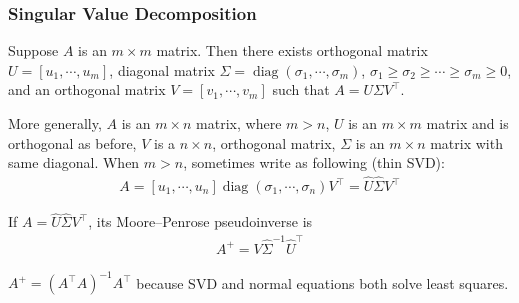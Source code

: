\documentclass[11pt]{article}
\numberwithin{equation}{section}
\begin{document}
\subsubsection{Singular Value Decomposition}
\begin{theorem}
    Suppose $A$ is an $ m \times m$ matrix. Then there exists orthogonal matrix $U=\left[u_1, \cdots, u_m\right]$, diagonal matrix $\Sigma=\operatorname{diag}\left(\sigma_1, \cdots, \sigma_m\right)$, $\sigma_1 \geq \sigma_2 \geq \cdots \geq \sigma_m \geq 0$,
    and an orthogonal matrix $V=\left[v_1, \cdots, v_m\right]$ such that $A=U\Sigma V^\top$.

    More generally, $A$ is an $ m \times n$ matrix, where $m>n$, $U$ is an $ m \times m$ matrix and is orthogonal as before, $V$ is a $ n \times n$, orthogonal matrix,
    $\Sigma$ is an $ m \times n$ matrix with same diagonal. When $m>n$, sometimes write as following (thin SVD): \begin{align*}
        A = \left[ u_1, \cdots, u_n \right] \operatorname{diag}\left(\sigma_1, \cdots, \sigma_n\right) V^\top = \hat{U}\hat{\Sigma}V^\top
    \end{align*}
\end{theorem}

\begin{definition}
    If $A=\hat{U}\hat{\Sigma}V^\top$, its Moore–Penrose pseudoinverse is \begin{align*}
        A^{+}=V \hat{\Sigma}^{-1} \hat{U}^{\top}
    \end{align*}
\end{definition}

\begin{fact}
    $A^{+}=\left(A^{\top} A\right)^{-1} A^{\top}$ because SVD and normal equations both solve least squares.
\end{fact}
\end{document}
